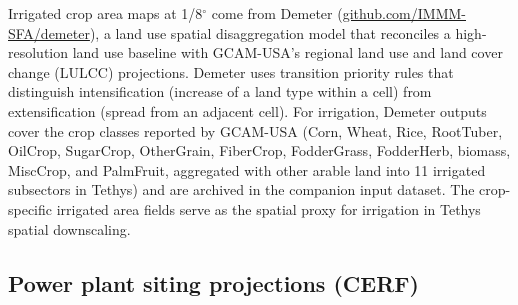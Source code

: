 \documentclass[fleqn,10pt]{wlscirep}
\begin{document}
Irrigated crop area maps at 1/8$^{\circ}$ come from Demeter\cite{Vernon-2018} (\href{https://github.com/IMMM-SFA/demeter}{github.com/IMMM-SFA/demeter}), a land use spatial disaggregation model that reconciles a high-resolution land use baseline with GCAM-USA's regional land use and land cover change (LULCC) projections. Demeter uses transition priority rules that distinguish intensification (increase of a land type within a cell) from extensification (spread from an adjacent cell). For irrigation, Demeter outputs cover the crop classes reported by GCAM-USA (Corn, Wheat, Rice, RootTuber, OilCrop, SugarCrop, OtherGrain, FiberCrop, FodderGrass, FodderHerb, biomass, MiscCrop, and PalmFruit, aggregated with other arable land into 11 irrigated subsectors in Tethys) and are archived in the companion input dataset\cite{brackenDataTethys_integration_metarepo}. The crop-specific irrigated area fields serve as the spatial proxy for irrigation in Tethys spatial downscaling.

\subsection*{Power plant siting projections (CERF)\label{sec:cerf}}
\end{document}
